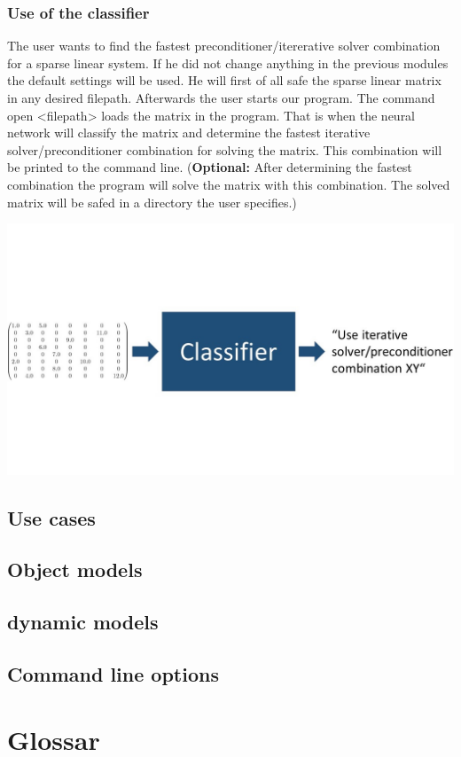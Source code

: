 \documentclass[parskip=full]{scrartcl}
\begin{document}
\subsubsection{Use of the classifier}

The user wants to find the fastest preconditioner/itererative solver combination for a sparse linear system. If he did not change anything in the previous modules the default settings will be used. He will first of all safe the sparse linear matrix in any desired filepath. Afterwards the user starts our program. The command open <filepath> loads the matrix in the program. That is when the neural network will classify the matrix and determine the fastest iterative solver/preconditioner combination for solving the matrix. This combination will be printed to the command line. (\textbf{Optional:} After determining the fastest combination the program will solve the matrix with this combination. The solved matrix will be safed in a directory the user specifies.)
\begin{center}
\includegraphics[width=\textwidth]{classifier}
\end{center}


\subsection{Use cases}
\subsection{Object models}
\subsection{dynamic models}
\subsection{Command line options}
\clearpage

\section{Glossar}

%
\printnoidxglossaries
\end{document}
